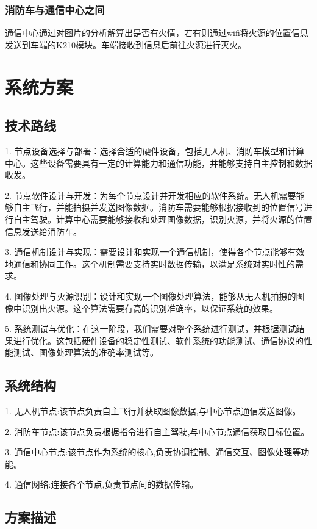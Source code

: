 \documentclass[12pt, a4paper, oneside]{article}
\begin{document}
\subsubsection{消防车与通信中心之间}

通信中心通过对图片的分析解算出是否有火情，若有则通过wifi将火源的位置信息发送到车端的K210模块。车端接收到信息后前往火源进行灭火。

\section{系统方案}

\subsection{技术路线}

1. 节点设备选择与部署：选择合适的硬件设备，包括无人机、消防车模型和计算中心。这些设备需要具有一定的计算能力和通信功能，并能够支持自主控制和数据收发。

2. 节点软件设计与开发：为每个节点设计并开发相应的软件系统。无人机需要能够自主飞行，并能拍摄并发送图像数据。消防车需要能够根据接收到的位置信号进行自主驾驶。计算中心需要能够接收和处理图像数据，识别火源，并将火源的位置信息发送给消防车。

3. 通信机制设计与实现：需要设计和实现一个通信机制，使得各个节点能够有效地通信和协同工作。这个机制需要支持实时数据传输，以满足系统对实时性的需求。

4. 图像处理与火源识别：设计和实现一个图像处理算法，能够从无人机拍摄的图像中识别出火源。这个算法需要有高的识别准确率，以保证系统的效果。

5. 系统测试与优化：在这一阶段，我们需要对整个系统进行测试，并根据测试结果进行优化。这包括硬件设备的稳定性测试、软件系统的功能测试、通信协议的性能测试、图像处理算法的准确率测试等。

\subsection{系统结构}

1. 无人机节点:该节点负责自主飞行并获取图像数据,与中心节点通信发送图像。

2. 消防车节点:该节点负责根据指令进行自主驾驶,与中心节点通信获取目标位置。

3. 通信中心节点:该节点作为系统的核心,负责协调控制、通信交互、图像处理等功能。

4. 通信网络:连接各个节点,负责节点间的数据传输。

\subsection{方案描述}
\end{document}
